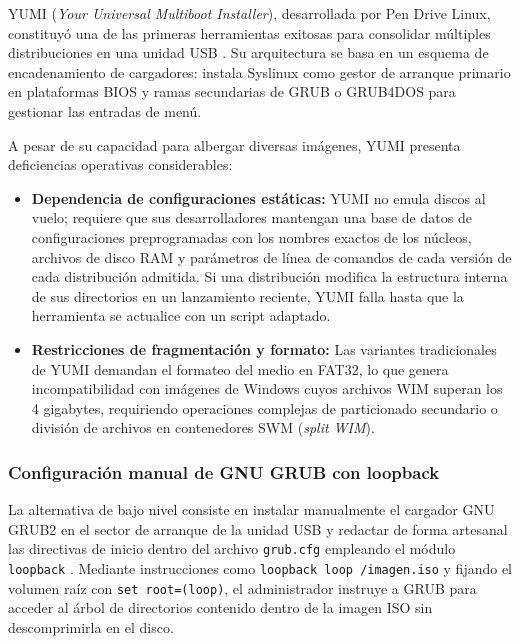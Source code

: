 \documentclass[12pt]{article}
\begin{document}
YUMI (\textit{Your Universal Multiboot Installer}), desarrollada por Pen Drive Linux, constituyó una de las primeras herramientas exitosas para consolidar múltiples distribuciones en una unidad USB \parencite{pendrivelinux2024yumi}. Su arquitectura se basa en un esquema de encadenamiento de cargadores: instala Syslinux como gestor de arranque primario en plataformas BIOS y ramas secundarias de GRUB o GRUB4DOS para gestionar las entradas de menú.

A pesar de su capacidad para albergar diversas imágenes, YUMI presenta deficiencias operativas considerables:
\begin{itemize}[noitemsep, topsep=2pt]
    \item \textbf{Dependencia de configuraciones estáticas:} YUMI no emula discos al vuelo; requiere que sus desarrolladores mantengan una base de datos de configuraciones preprogramadas con los nombres exactos de los núcleos, archivos de disco RAM y parámetros de línea de comandos de cada versión de cada distribución admitida. Si una distribución modifica la estructura interna de sus directorios en un lanzamiento reciente, YUMI falla hasta que la herramienta se actualice con un script adaptado.
    \item \textbf{Restricciones de fragmentación y formato:} Las variantes tradicionales de YUMI demandan el formateo del medio en FAT32, lo que genera incompatibilidad con imágenes de Windows cuyos archivos WIM superan los 4 gigabytes, requiriendo operaciones complejas de particionado secundario o división de archivos en contenedores SWM (\textit{split WIM}).
\end{itemize}

\subsubsection{Configuración manual de GNU GRUB con loopback}

La alternativa de bajo nivel consiste en instalar manualmente el cargador GNU GRUB2 en el sector de arranque de la unidad USB y redactar de forma artesanal las directivas de inicio dentro del archivo \texttt{grub.cfg} empleando el módulo \texttt{loopback} \parencite{gnugrub2024manual}. Mediante instrucciones como \texttt{loopback loop /imagen.iso} y fijando el volumen raíz con \texttt{set root=(loop)}, el administrador instruye a GRUB para acceder al árbol de directorios contenido dentro de la imagen ISO sin descomprimirla en el disco.
\end{document}
